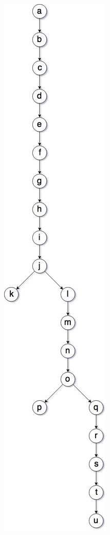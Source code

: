 \documentclass{article}
\begin{document}
{\begin{figure}[h]
\begin{minipage}[h]{0.2\textwidth}
      \includegraphics[width=\textwidth]{spanning_tree}

\end{minipage}
\end{figure}}
\end{document}
